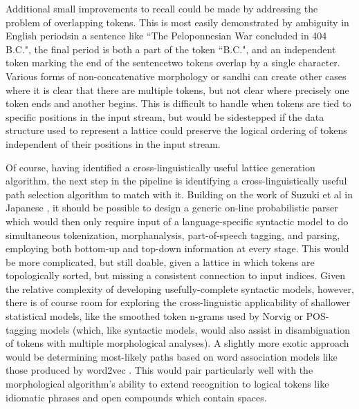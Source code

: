 Additional small improvements to recall could be made by addressing the problem of overlapping tokens. This is most easily demonstrated by ambiguity in English periods\textemdash in a sentence like ``The Peloponnesian War concluded in 404 B.C.", the final period is both a part of the token ``B.C.", and an independent token marking the end of the sentence\textemdash two tokens overlap by a single character. Various forms of non-concatenative morphology or sandhi can create other cases where it is clear that there are multiple tokens, but not clear where precisely one token ends and another begins. This is difficult to handle when tokens are tied to specific positions in the input stream, but would be sidestepped if the data structure used to represent a lattice could preserve the logical ordering of tokens independent of their positions in the input stream.

Of course, having identified a cross-linguistically useful lattice generation algorithm, the next step in the pipeline is identifying a cross-linguistically useful path selection algorithm to match with it. Building on the work of Suzuki et al in Japanese \cite{suzuki00}, it should be possible to design a generic on-line probabilistic parser which would then only require input of a language-specific syntactic model to do simultaneous tokenization, morphanalysis, part-of-speech tagging, and parsing, employing both bottom-up and top-down information at every stage. This would be more complicated, but still doable, given a lattice in which tokens are topologically sorted, but missing a consistent connection to input indices. Given the relative complexity of developing usefully-complete syntactic models, however, there is of course room for exploring the cross-linguistic applicability of shallower statistical models, like the smoothed token n-grams used by Norvig \cite{norvig14} or POS-tagging models (which, like syntactic models, would also assist in disambiguation of tokens with multiple morphological analyses). A slightly more exotic approach would be determining most-likely paths based on word association models like those produced by word2vec \cite{mikolov13}. This would pair particularly well with the morphological algorithm's ability to extend recognition to logical tokens like idiomatic phrases and open compounds which contain spaces.